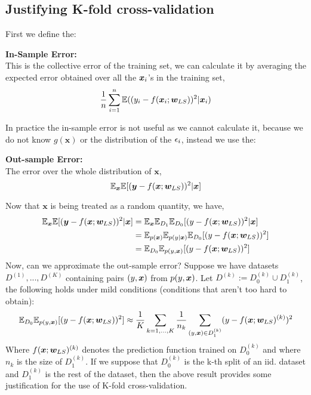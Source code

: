 \subsection{Justifying K-fold cross-validation}
First we define the:
\begin{definition} \label{def:in-sample-error}
    \textbf{In-Sample Error:} \\
    This is the collective error of the training set, we can calculate it by averaging the expected error obtained over all the $\bm{x}_{i}$'s in the training set,
    \begin{equation}
        \frac{1}{n} \sum_{i=1}^{n} \mathbb{E}( (y_{i} - f(\bm{x}_{i} ; \bm{w}_{LS}))^{2} | \bm{x}_{i}) 
    \end{equation}
\end{definition}
In practice the in-sample error is not useful as we cannot calculate it, because we do not know $g(\bm{x})$ or the distribution of the $\epsilon_{i}$, instead we use the:
\begin{definition} \label{def:out-sample-error}
    \textbf{Out-sample Error:} \\
    The error over the whole distribution of $\bm{x}$,
    \begin{equation}
        \mathbb{E}_{\bm{x}} \mathbb{E} [ (\bm{y} - f(\bm{x} ; \bm{w}_{LS}) )^{2} | \bm{x}]
    \end{equation}
\end{definition}
Now that $\bm{x}$ is being treated as a random quantity, we have,
\begin{align}
    \mathbb{E}_{\bm{x}} \mathbb{E} [ (\bm{y} - f(\bm{x} ; \bm{w}_{LS}) )^{2} | \bm{x}] &{} 
    = \mathbb{E}_{\bm{x}} \mathbb{E}_{D_{1}} \mathbb{E}_{D_{0}} [ (y - f(\bm{x} ; \bm{w}_{LS}))^{2} | \bm{x}] \\
    &= \mathbb{E}_{p(\bm{x})} \mathbb{E}_{p(y | \bm{x})} \mathbb{E}_{D_{0}} [ (y - f(\bm{x} ; \bm{w}_{LS}))^{2}] \\
    &= \mathbb{E}_{D_{0}} \mathbb{E}_{p(y, \bm{x})} [(y- f(\bm{x} ; \bm{w}_{LS}))^{2}]
\end{align}
Now, can we approximate the out-sample error? Suppose we have datasets $D^{(1)}, ... , D^{(K)}$ containing pairs $(y, \bm{x})$ from $p(y,\bm{x})$. Let $D^{(k)} := D_{0}^{(k)} \cup D_{1}^{(k)}$, the following holds under mild conditions (conditions that aren't too hard to obtain):
\begin{equation}
    \mathbb{E}_{D_{0}} \mathbb{E}_{p(y, \bm{x})} [(y- f(\bm{x} ; \bm{w}_{LS}))^{2}] \approx \frac{1}{K} \sum_{k=1,...,K} \frac{1}{n_{k}} \sum_{(y,\bm{x}) \in D_{1}^{(k)}} (y - f(\bm{x} ; \bm{w}_{LS})^{(k)})^{2}
\end{equation}
Where $f(\bm{x} ; \bm{w}_{LS})^{(k)}$ denotes the prediction function trained on $D_{0}^{(k)}$ and where $n_{k}$ is the size of $D_{1}^{(k)}$. If we suppose that $D_{0}^{(k)}$ is the k-th split of an iid. dataset and $D_{1}^{(k)}$ is the rest of the dataset, then the above result provides some justification for the use of K-fold cross-validation. 